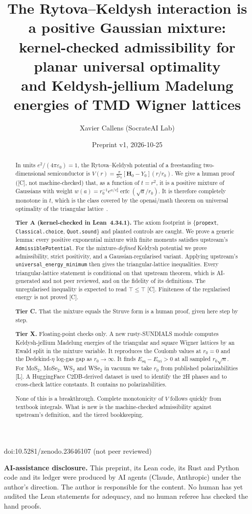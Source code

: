 \documentclass[11pt]{article}
\title{The Rytova--Keldysh interaction is a positive Gaussian mixture:\\ kernel-checked admissibility for planar
universal optimality\\ and Keldysh-jellium Madelung energies of TMD Wigner lattices}
\author{Xavier Callens (SocrateAI Lab)}
\date{Preprint v1, 2026-10-25}
\theoremstyle{remark}
\newcommand{\tier}[1]{\textsf{[#1]}}
\newcommand{\lean}[1]{\texttt{#1}}
\begin{document}
\maketitle
\begin{center}\small doi:10.5281/zenodo.23646107 \quad (not peer reviewed)\end{center}


\noindent\textbf{AI-assistance disclosure.} This preprint, its Lean code, its Rust and Python code and its ledger were
produced by AI agents (Claude, Anthropic) under the author's direction. The author is responsible for the content. No
human has yet audited the Lean statements for adequacy, and no human referee has checked the hand proofs.

\begin{abstract}
In units $e^2/(4\pi\varepsilon_0)=1$, the Rytova--Keldysh potential of a freestanding two-dimensional semiconductor is
$V(r)=\frac{\pi}{2r_0}[\mathbf H_0-Y_0](r/r_0)$. We give a human proof (\tier{C}, not machine-checked) that, as a
function of $t=r^2$, it is a positive mixture of Gaussians with weight
$w(a)=r_0^{-1}e^{a/r_0^2}\operatorname{erfc}(\sqrt a/r_0)$. It is therefore completely monotone
in $t$, which is the class covered by the openai/math theorem on universal optimality of the triangular
lattice~\cite{oai}.

\textbf{Tier A (kernel-checked in Lean~4.34.1).} The axiom footprint is $\{$\lean{propext}, \lean{Classical.choice},
\lean{Quot.sound}$\}$ and planted controls are caught. We prove a generic lemma: every positive exponential mixture with
finite moments satisfies upstream's \lean{AdmissiblePotential}. For the mixture-\emph{defined} Keldysh potential we
prove admissibility, strict positivity, and a Gaussian-regularised variant. Applying upstream's
\lean{universal\_energy\_minimum} then gives the triangular-lattice inequalities. Every triangular-lattice statement
is conditional on that upstream theorem, which is AI-generated and not peer reviewed, and on the fidelity of its
definitions. The unregularised inequality is expected to read $\top\le\top$ \tier{C}. Finiteness of the regularised
energy is not proved \tier{C}.

\textbf{Tier C.} That the mixture equals the Struve form is a human proof, given here step by step.

\textbf{Tier X.} Floating-point checks only. A new rusty-SUNDIALS module computes Keldysh-jellium Madelung energies of
the triangular and square Wigner lattices by an Ewald split in the mixture variable. It reproduces the Coulomb values
at $r_0=0$ and the Dedekind-$\eta$ log-gas gap as $r_0\to\infty$. It finds $E_\mathrm{sq}-E_\mathrm{tri}>0$ at all
\KTNScan{} sampled $r_0\sqrt n$. For MoS$_2$, MoSe$_2$, WS$_2$ and WSe$_2$ in vacuum we take $r_0$ from published
polarizabilities \tier{L}. A HuggingFace C2DB-derived dataset is used to identify the 2H phases and to cross-check
lattice constants. It contains no polarizabilities.

None of this is a breakthrough. Complete monotonicity of $V$ follows quickly from textbook integrals. What is new is
the machine-checked admissibility against upstream's definition, and the tiered bookkeeping.
\end{abstract}
\end{document}
